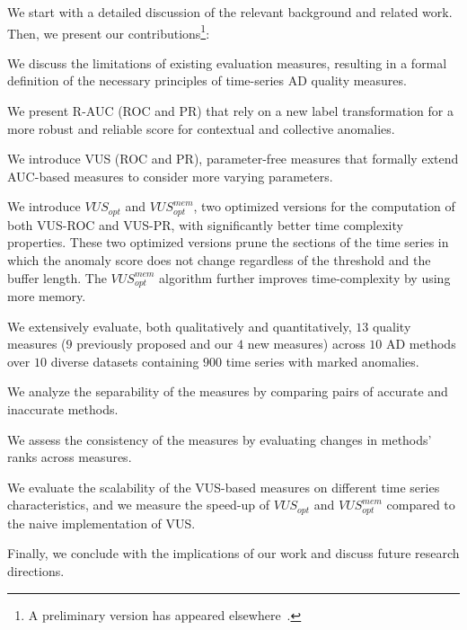  We start with a detailed discussion of the relevant background and related work. Then, we present our contributions\footnote{A preliminary version has appeared elsewhere~\cite{DBLP:journals/pvldb/PaparrizosBPTEF22}.}:

 We discuss the limitations of existing evaluation measures, resulting in a formal definition of the necessary principles of time-series AD quality measures.

 We present R-AUC (ROC and PR) that rely on a new label transformation for a more robust and reliable score for contextual and collective anomalies.

 We introduce VUS (ROC and PR), parameter-free measures that formally extend AUC-based measures to consider more varying parameters.

 We introduce $VUS_{opt}$ and $VUS^{mem}_{opt}$, two optimized versions for the computation of both VUS-ROC and VUS-PR, with significantly better time complexity properties. These two optimized versions prune the sections of the time series in which the anomaly score does not change regardless of the threshold and the buffer length. The $VUS^{mem}_{opt}$ algorithm further improves time-complexity by using more memory.

 We extensively evaluate, both qualitatively and quantitatively, $13$ quality measures ($9$ previously proposed and our $4$ new measures) across $10$ AD methods over $10$ diverse datasets containing $900$ time series with marked anomalies.

 We analyze the separability of the measures by comparing pairs of accurate and inaccurate methods.

 We assess the consistency of the measures by evaluating changes in methods' ranks across measures.

 We evaluate the scalability of the VUS-based measures on different time series characteristics, and we measure the speed-up of $VUS_{opt}$ and $VUS^{mem}_{opt}$ compared to the naive implementation of VUS.

 Finally, we conclude with the implications of our work and discuss future research directions.




